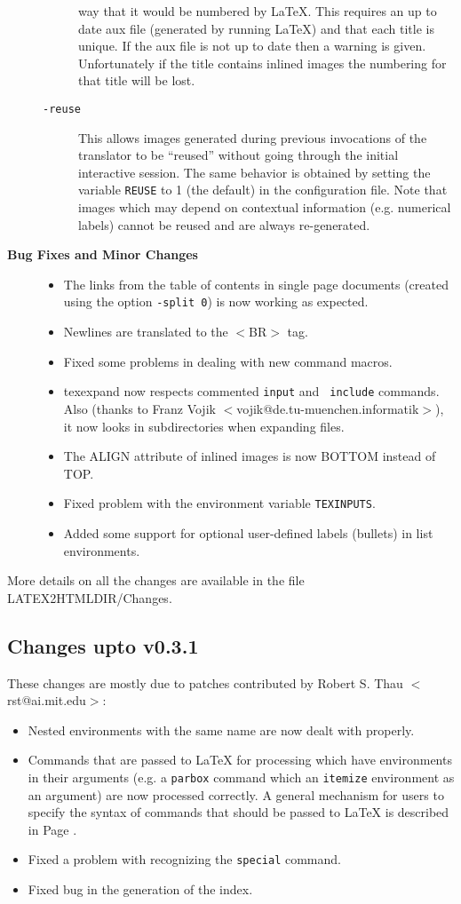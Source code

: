\begin{description}
\begin{description}
way that it would be numbered by \LaTeX. This requires 
an up to date {\fn aux} file (generated by running \LaTeX) and that 
each title is unique. If the {\fn aux} file is not up to date then a 
warning is given.
Unfortunately if 
the title contains inlined images the numbering for that title will
be lost. 
\item[{\tt -reuse}]
This allows images generated during previous invocations of
the translator to be ``reused'' without going through the initial 
interactive session. The same behavior is obtained by setting
the variable {\tt REUSE} to 1 (the default) in the configuration file.
Note that images which may depend on contextual information (e.g. numerical
labels) cannot be reused and are always re-generated. 
\end{description}
\item[{\bf Bug Fixes and Minor Changes}] \hfill
\begin{itemize}
\item The links from the table of contents in single page documents (created using
the option {\tt -split 0}) is now working as expected.
\item Newlines are translated to the $<$BR$>$ tag.
\item Fixed some problems in dealing with new command macros.
\item {\fn texexpand} now respects commented {\tt input} and {\tt
include} commands. Also (thanks to Franz Vojik
$<$vojik@de.tu-muenchen.informatik$>$), it 
now looks in subdirectories when expanding
files.
\item The ALIGN attribute of inlined images is now BOTTOM instead of
TOP.
\item Fixed problem with the environment variable {\tt TEXINPUTS}.
\item Added some support for optional user-defined labels (bullets) in
list environments.
\end{itemize}
\end{description}

More details on all the changes are available in the file 
{\fn LATEX2HTMLDIR/Changes}.

\subsection{Changes upto v0.3.1}
These changes are mostly due to patches contributed by Robert S. Thau
$<$rst@ai.mit.edu$>$:
\begin{itemize}
\item Nested environments with the same name are now dealt with
properly.
\item Commands that are passed to LaTeX for processing which have 
environments in their arguments (e.g. a {\tt parbox} command which 
an {\tt itemize} environment as an argument) are now
processed correctly. A general mechanism for users to 
specify the syntax of commands that should be passed to LaTeX 
is described in Page \pageref{pass}.
\item Fixed a problem with recognizing the {\tt special} command.
\item Fixed bug in the generation of the index.
\end{itemize}

